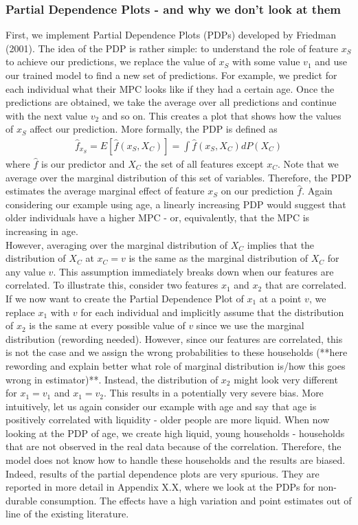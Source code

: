 \subsubsection{Partial Dependence Plots - and why we don't look at them}
First, we implement Partial Dependence Plots (PDPs) developed by Friedman (2001). The idea of the PDP is rather simple: to understand the role of feature $x_S$ to achieve our predictions, we replace the value of $x_S$ with some value $v_1$ and use our trained model to find a new set of predictions. For example, we predict for each individual what their MPC looks like if they had a certain age. Once the predictions are obtained, we take the average over all predictions and continue with the next value $v_2$ and so on. This creates a plot that shows how the values of $x_S$ affect our prediction. More formally, the PDP is defined as
\begin{align*}
    \hat{f}_{x_S}=E[\hat{f}(x_S, X_C)]=\int\hat{f}(x_S, X_C)dP(X_C)
\end{align*}
where $\hat{f}$ is our predictor and $X_C$ the set of all features except $x_C$. Note that we average over the marginal distribution of this set of variables. Therefore, the PDP estimates the average marginal effect of feature $x_S$ on our prediction $\hat{f}$. Again considering our example using age, a linearly increasing PDP would suggest that older individuals have a higher MPC - or, equivalently, that the MPC is increasing in age. \\
However, averaging over the marginal distribution of $X_C$ implies that the distribution of $X_C$ at $x_C=v$  is the same as the marginal distribution of $X_C$ for any value $v$. This assumption immediately breaks down when our features are correlated. To illustrate this, consider two features $x_1$ and $x_2$ that are correlated. If we now want to create the Partial Dependence Plot of $x_1$ at a point $v$, we replace $x_1$ with $v$ for each individual and implicitly assume that the distribution of $x_2$ is the same at every possible value of $v$ since we use the marginal distribution (rewording needed). However, since our features are correlated, this is not the case and we assign the wrong probabilities to these households (**here rewording and explain better what role of marginal distribution is/how this goes wrong in estimator)**. Instead, the distribution of $x_2$ might look very different for $x_1=v_1$ and $x_1=v_2$. This results in a potentially very severe bias. More intuitively, let us again consider our example with age and say that age is positively correlated with liquidity - older people are more liquid. When now looking at the PDP of age, we create high liquid, young households - households that are not observed in the real data because of the correlation. Therefore, the model does not know how to handle these households and the results are biased. \\
Indeed, results of the partial dependence plots are very spurious. They are reported in more detail in Appendix X.X, where we look at the PDPs for non-durable consumption. The effects have a high variation and point estimates out of line of the existing literature. 

